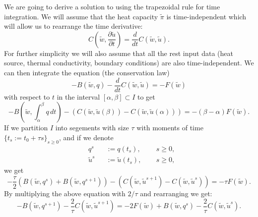 \begin{discussion}
  \label{cmc/diffusion/discrete/transient/mixed_weak_solve_trapezoidal-discussion}
  We are going to derive a solution to
  using the trapezoidal rule for time integration.
  We will assume that the heat capacity $\tilde{\pi}$ is time-independent which will
  allow us to rearrange the time derivative:
  \begin{equation}
    C(\tilde{w}, \frac{\partial \tilde{u}} {\partial t})
    = \frac{d}{d t} C(\tilde{w}, \tilde{u}).
  \end{equation}
  For further simplicity we will also assume that all the rest input data (heat
  source, thermal conductivity, boundary conditions) are also time-independent.
  We can then integrate the equation (the conservation law)
  \begin{equation}
    - B(\tilde{w}, q) - \frac{d}{d t} C(\tilde{w}, \tilde{u}) = - F(\tilde{w})
  \end{equation}
  with respect to $t$ in the interval $[\alpha, \beta] \subset I$ to get
  \begin{equation}
    - B(\tilde{w}, \int_\alpha^\beta q\, d t)
    - (C(\tilde{w}, \tilde{u}(\beta)) - C(\tilde{w}, \tilde{u}(\alpha)))
    = - (\beta - \alpha) F(\tilde{w}).
  \end{equation}
  If we partition $I$ into segements with size $\tau$ with moments of
  time $\{t_s := t_0 + \tau s\}_{s \geq 0}$, and if we denote
  \begin{subequations}
    \begin{alignat}{3}
      & q^s
      && := q(t_s), \enspace
      && s \geq 0, \\
      & \tilde{u}^s
      && := \tilde{u}(t_s), \enspace
      && s \geq 0,
    \end{alignat}
  \end{subequations}
  we get
  \begin{equation}
    - \frac{\tau}{2} (B(\tilde{w}, q^s) + B(\tilde{w}, q^{s + 1}))
    - (C(\tilde{w}, \tilde{u}^{s + 1}) - C(\tilde{w}, \tilde{u}^s))
    = - \tau F(\tilde{w}).
  \end{equation}
  By multiplying the above equation with $2 / \tau$ and rearranging we get:
  \begin{equation}
    - B(\tilde{w}, q^{s + 1}) - \frac{2}{\tau} C(\tilde{w}, \tilde{u}^{s + 1})
    = - 2 F(\tilde{w}) + B(\tilde{w}, q^s)
    - \frac{2}{\tau} C(\tilde{w}, \tilde{u}^s).
  \end{equation}

\end{discussion}
